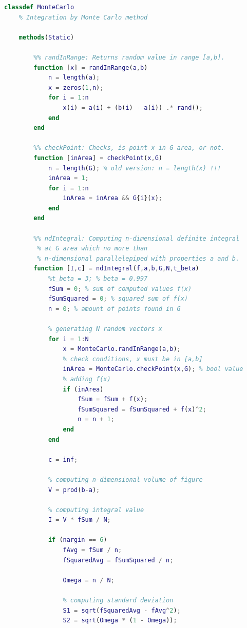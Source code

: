 \documentclass[a4paper,12pt]{article}
\begin{document}
\begin{lstlisting}[language=MATLAB]
classdef MonteCarlo
    % Integration by Monte Carlo method
    
    methods(Static)
        
        %% randInRange: Returns random value in range [a,b].
        function [x] = randInRange(a,b)
            n = length(a);
            x = zeros(1,n);
            for i = 1:n
                x(i) = a(i) + (b(i) - a(i)) .* rand();
            end
        end
        
        %% checkPoint: Checks, is point x in G area, or not.
        function [inArea] = checkPoint(x,G)
            n = length(G); % old version: n = length(x) !!!
            inArea = 1;
            for i = 1:n
                inArea = inArea && G{i}(x);
            end
        end
        
        %% ndIntegral: Computing n-dimensional definite integral 
         % at G area which no more than 
         % n-dimensional parallelepiped with properties a and b.
        function [I,c] = ndIntegral(f,a,b,G,N,t_beta)
            %t_beta = 3; % beta = 0.997
            fSum = 0; % sum of computed values f(x)
            fSumSquared = 0; % squared sum of f(x)
            n = 0; % amount of points found in G
            
            % generating N random vectors x
            for i = 1:N
                x = MonteCarlo.randInRange(a,b);
                % check conditions, x must be in [a,b]
                inArea = MonteCarlo.checkPoint(x,G); % bool value
                % adding f(x)
                if (inArea)
                    fSum = fSum + f(x);
                    fSumSquared = fSumSquared + f(x)^2;
                    n = n + 1;
                end
            end
           
            c = inf;
            
            % computing n-dimensional volume of figure
            V = prod(b-a);
            
            % computing integral value
            I = V * fSum / N;
            
            if (nargin == 6)
                fAvg = fSum / n;
                fSquaredAvg = fSumSquared / n;
                
                Omega = n / N;
                
                % computing standard deviation
                S1 = sqrt(fSquaredAvg - fAvg^2);
                S2 = sqrt(Omega * (1 - Omega));
                

\end{lstlisting}
\end{document}
